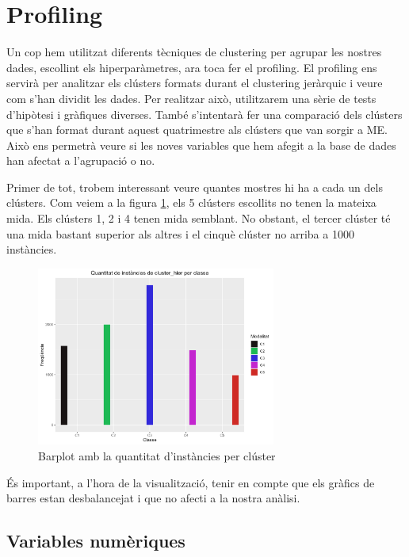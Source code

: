\documentclass{article}
\begin{document}
\section{Profiling}

Un cop hem utilitzat diferents tècniques de clustering per agrupar les nostres dades, escollint els hiperparàmetres, ara toca fer el profiling. El profiling ens servirà per analitzar els clústers formats durant el clustering jeràrquic i veure com s'han dividit les dades. Per realitzar això, utilitzarem una sèrie de tests d'hipòtesi i gràfiques diverses. També s'intentarà fer una comparació dels clústers que s'han format durant aquest quatrimestre als clústers que van sorgir a ME. Això ens permetrà veure si les noves variables que hem afegit a la base de dades han afectat a l'agrupació o no. 

Primer de tot, trobem interessant veure quantes mostres hi ha a cada un dels clústers. Com veiem a la figura \ref{fig:Cat_BarPlot_cluster_hier}, els 5 clústers escollits no tenen la mateixa mida. Els clústers 1, 2 i 4 tenen mida semblant. No obstant, el tercer clúster té una mida bastant superior als altres i el cinquè clúster no arriba a 1000 instàncies.

\begin{figure}[H] 
    \centering
    \includegraphics[width=0.7\textwidth]{Images/5_Profiling/categoriques/cat/Cat_BarPlot_cluster_hier.png}
    \caption{Barplot amb la quantitat d'instàncies per clúster}
    \label{fig:Cat_BarPlot_cluster_hier}
\end{figure}

És important, a l'hora de la visualització, tenir en compte que els gràfics de barres estan desbalancejat i que no afecti a la nostra anàlisi. 

\subsection{Variables numèriques}
\end{document}
